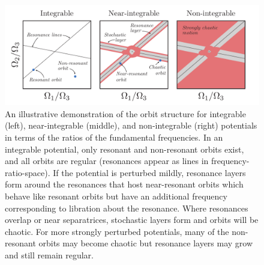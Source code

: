 \documentclass[letterpaper,12pt,preprint]{aastex}
\begin{document}
\begin{figure}[!p]
\begin{center}
\includegraphics[width=\textwidth]{figures/cartoons.pdf}
\caption{An illustrative demonstration of the orbit structure for integrable (left), near-integrable (middle), and non-integrable (right) potentials in terms of the ratios of the fundamental frequencies. In an integrable potential, only resonant and non-resonant orbits exist, and all orbits are regular (resonances appear as lines in frequency-ratio-space). If the potential is perturbed mildly, resonance layers form around the resonances that host near-resonant orbits which behave like resonant orbits but have an additional frequency corresponding to libration about the resonance. Where resonances overlap or near separatrices, stochastic layers form and orbits will be chaotic. For more strongly perturbed potentials, many of the non-resonant orbits may become chaotic but resonance layers may grow and still remain regular. } 
\label{fig:cartoons}
\end{center}
\end{figure}
\end{document}
